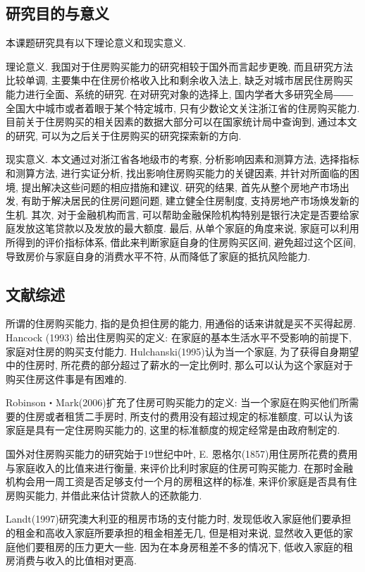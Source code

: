 \documentclass[a4paper, 12pt, twoside]{ctexart}
\begin{document}
\subsection{研究目的与意义}
    本课题研究具有以下理论意义和现实意义.

    理论意义. 我国对于住房购买能力的研究相较于国外而言起步更晚, 而且研究方法比较单调, 主要集中在住房价格收入比和剩余收入法上, 缺乏对城市居民住房购买能力进行全面、系统的研究. 在对研究对象的选择上, 国内学者大多研究全局――全国大中城市或者着眼于某个特定城市, 只有少数论文关注浙江省的住房购买能力. 目前关于住房购买的相关因素的数据大部分可以在国家统计局中查询到, 通过本文的研究, 可以为之后关于住房购买的研究探索新的方向.

    现实意义. 本文通过对浙江省各地级市的考察, 分析影响因素和测算方法, 选择指标和测算方法, 进行实证分析, 找出影响住房购买能力的关键因素, 并针对所面临的困境, 提出解决这些问题的相应措施和建议. 研究的结果, 首先从整个房地产市场出发, 有助于解决居民的住房问题问题, 建立健全住房制度, 支持房地产市场焕发新的生机. 其次, 对于金融机构而言, 可以帮助金融保险机构特别是银行决定是否要给家庭发放这笔贷款以及发放的最大额度. 最后, 从单个家庭的角度来说, 家庭可以利用所得到的评价指标体系, 借此来判断家庭自身的住房购买区间, 避免超过这个区间, 导致房价与家庭自身的消费水平不符, 从而降低了家庭的抵抗风险能力.
\subsection{文献综述}

   所谓的住房购买能力, 指的是负担住房的能力, 用通俗的话来讲就是买不买得起房. Hancock (1993) 给出住房购买的定义: 在家庭的基本生活水平不受影响的前提下, 家庭对住房的购买支付能力. Hulchanski(1995)认为当一个家庭, 为了获得自身期望中的住房时, 所花费的部分超过了薪水的一定比例时, 那么可以认为这个家庭对于购买住房这件事是有困难的.

   Robinson・Mark(2006)扩充了住房可购买能力的定义: 当一个家庭在购买他们所需要的住房或者租赁二手房时, 所支付的费用没有超过规定的标准额度, 可以认为该家庭是具有一定住房购买能力的, 这里的标准额度的规定经常是由政府制定的.

   国外对住房购买能力的研究始于19世纪中叶, E. 恩格尔(1857)用住房所花费的费用与家庭收入的比值来进行衡量, 来评价比利时家庭的住房可购买能力. 在那时金融机构会用一周工资是否足够支付一个月的房租这样的标准, 来评价家庭是否具有住房购买能力, 并借此来估计贷款人的还款能力.

    Landt(1997)研究澳大利亚的租房市场的支付能力时, 发现低收入家庭他们要承担的租金和高收入家庭所要承担的租金相差无几, 但是相对来说, 显然收入更低的家庭他们要租房的压力更大一些. 因为在本身房租差不多的情况下, 低收入家庭的租房消费与收入的比值相对更高.
\end{document}

